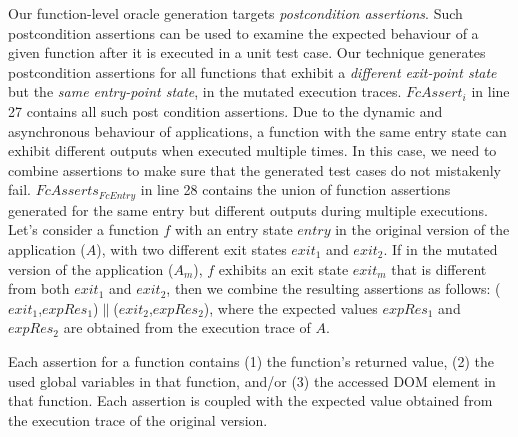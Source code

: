Our function-level oracle generation targets \emph{postcondition assertions}.
Such postcondition assertions can be used to examine the expected behaviour of a given function after it is executed in a unit test case.
Our technique generates postcondition assertions for all functions that exhibit a \emph{different exit-point state} but the \emph{same entry-point state}, in the mutated execution traces. $FcAssert_i$ in line 27 contains all such post condition assertions. 
Due to the dynamic and asynchronous behaviour of \javascript applications, a function with the same entry state can exhibit different outputs when executed multiple times. %
In this case, we need to combine assertions to make sure that the generated test cases do not mistakenly fail. $FcAsserts_{FcEntry}$ in line 28
contains the union of function assertions generated for the same entry but different outputs during multiple executions.  
Let's consider a function $f$ with an entry state $entry$ in the original version of the application ($A$), with two different exit states $exit_1$ and $exit_2$. If in the mutated version of the application ($A_m$),  $f$ exhibits an exit state $exit_m$ that is different from both $exit_1$ and $exit_2$, then we combine the resulting assertions as follows: 
%
($exit_1$,$expRes_1$)$\parallel$($exit_2$,$expRes_2$), where the expected values $expRes_1$ and $expRes_2$ are obtained from the execution trace of  $A$. 

Each assertion for a function contains (1) the function's returned value, (2) the used global variables in that function, and/or (3) the accessed DOM element in that function. Each assertion is coupled with the expected value obtained from the execution trace of the original version. 
%


